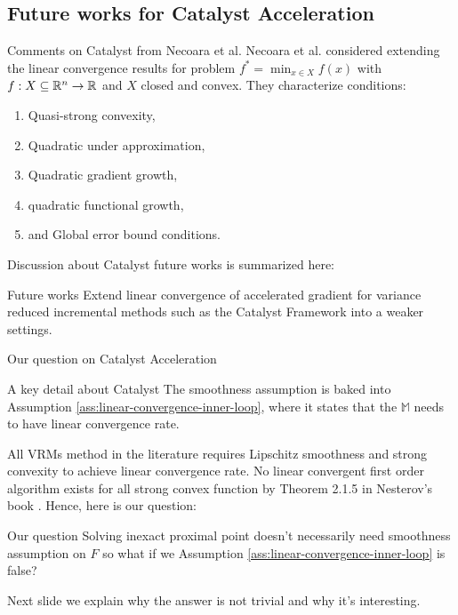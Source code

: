 \documentclass[11pt]{beamer}
\theoremstyle{definition}
\begin{document}
    \subsection{Future works for Catalyst Acceleration}
        \begin{frame}{Comments on Catalyst from Necoara et al. }
            Necoara et al. \cite{necoara_linear_2019} considered extending the linear convergence results for problem $f^* = \min_{x \in X} f(x)$ with $f: X \subseteq \mathbb R^n \rightarrow \mathbb R$ and $X$ closed and convex.
            They characterize conditions: 
            \begin{enumerate}
                \item Quasi-strong convexity, 
                \item Quadratic under approximation, 
                \item Quadratic gradient growth,
                \item quadratic functional growth, 
                \item and Global error bound conditions. 
            \end{enumerate}
            Discussion about Catalyst future works is summarized here: 
            \begin{alertblock}{Future works}
                Extend linear convergence of accelerated gradient for variance reduced incremental methods such as the Catalyst Framework into a weaker settings. 
            \end{alertblock}
            
        \end{frame}
        \begin{frame}{Our question on Catalyst Acceleration}
            \begin{block}{A key detail about Catalyst}
                The smoothness assumption is baked into Assumption \ref{ass:linear-convergence-inner-loop}, where it states that the $\mathbb M$ needs to have linear convergence rate. 
            \end{block}
            All VRMs method in the literature requires Lipschitz smoothness and strong convexity to achieve linear convergence rate. 
            No linear convergent first order algorithm exists for all strong convex function by Theorem 2.1.5 in Nesterov's book \cite{nesterov_lectures_2018}. 
            Hence, here is our question: 
            \begin{alertblock}{Our question}
                Solving inexact proximal point doesn't necessarily need smoothness assumption on $F$ so what if we Assumption \ref{ass:linear-convergence-inner-loop} is false? 
            \end{alertblock}
            Next slide we explain why the answer is not trivial and why it's interesting. 
        \end{frame}
\end{document}

